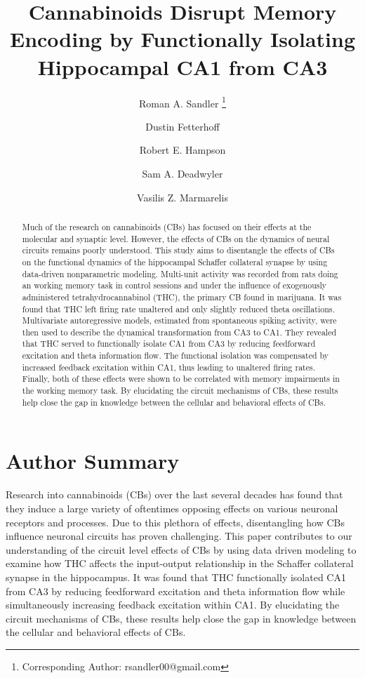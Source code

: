 \documentclass[11pt,a4paper,final]{article}
\title{\vspace{-30mm}\fontsize{14pt}{1pt}\textbf{Cannabinoids Disrupt Memory Encoding by Functionally Isolating Hippocampal CA1 from CA3}} %
\author[1]{Roman A. Sandler     \thanks{Corresponding Author: rsandler00@gmail.com}}
\author[2]{Dustin Fetterhoff    }   %
\author[2]{Robert E. Hampson    }	%
\author[2]{Sam A. Deadwyler     }	%
\author[1]{Vasilis Z. Marmarelis}
\affil[1]{Department of Biomedical Engineering, University of Southern California, Los Angeles, CA, USA}
\affil[2]{Department of Physiology \& Pharmacology, Wake Forest University, Winston-Salem, NC, USA}
\begin{document}
\maketitle %

\begin{abstract}
Much of the research on cannabinoids (CBs) has focused on their effects at the molecular and synaptic level.
However, the effects of CBs on the dynamics of neural circuits remains poorly understood.
This study aims to disentangle the effects of CBs on the functional dynamics of the hippocampal Schaffer collateral synapse by using data-driven nonparametric modeling.
Multi-unit activity was recorded from rats doing an working memory task in control sessions and under the influence of exogenously administered tetrahydrocannabinol (THC), the primary CB found in marijuana.
It was found that THC left firing rate unaltered and only slightly reduced theta oscillations.
Multivariate autoregressive models, estimated from spontaneous spiking activity, were then used to describe the dynamical transformation from CA3 to CA1.
They revealed that THC served to functionally isolate CA1 from CA3 by reducing feedforward excitation and theta information flow.
The functional isolation was compensated by increased feedback excitation within CA1, thus leading to unaltered firing rates.
Finally, both of these effects were shown to be correlated with memory impairments in the working memory task.
By elucidating the circuit mechanisms of CBs, these results help close the gap in knowledge between the cellular and behavioral effects of CBs.
\end{abstract}

\section*{Author Summary}
Research into cannabinoids (CBs) over the last several decades has found that they induce a large variety of oftentimes opposing effects on various neuronal receptors and processes.
Due to this plethora of effects, disentangling how CBs influence neuronal circuits has proven challenging.
This paper contributes to our understanding of the circuit level effects of CBs by using data driven modeling to examine how THC affects the input-output relationship in the Schaffer collateral synapse in the hippocampus.
It was found that THC functionally isolated CA1 from CA3 by reducing feedforward excitation and theta information flow while simultaneously increasing feedback excitation within CA1.
By elucidating the circuit mechanisms of CBs, these results help close the gap in knowledge between the cellular and behavioral effects of CBs.
\end{document}

